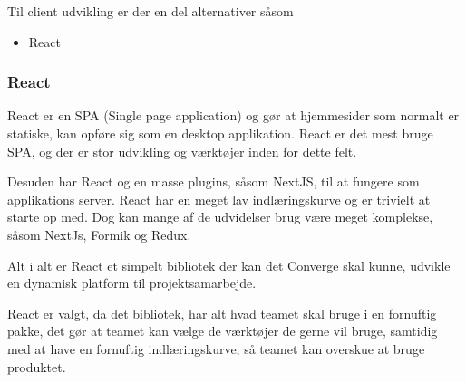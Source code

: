 Til client udvikling er der en del alternativer såsom

\begin{itemize}
    \item React
\end{itemize}

\subsubsection{React}

React er en SPA (Single page application) og gør at hjemmesider som normalt er statiske, kan opføre sig som en desktop applikation. React er det mest bruge SPA, og der er stor udvikling og værktøjer inden for dette felt.

Desuden har React og en masse plugins, såsom NextJS, til at fungere som applikations server. React har en meget lav indlæringskurve og er trivielt at starte op med. Dog kan mange af de udvidelser brug være meget komplekse, såsom NextJs, Formik og Redux. 

Alt i alt er React et simpelt bibliotek der kan det Converge skal kunne, udvikle en dynamisk platform til projektsamarbejde.

React er valgt, da det bibliotek, har alt hvad teamet skal bruge i en fornuftig pakke, det gør at teamet kan vælge de værktøjer de gerne vil bruge, samtidig med at have en fornuftig indlæringskurve, så teamet kan overskue at bruge produktet.